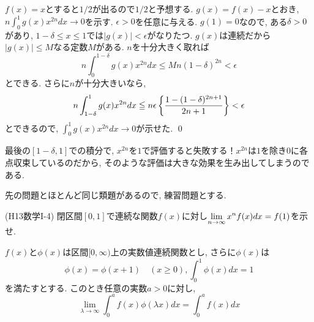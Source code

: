 \begin{egans} $f(x) = x$とすると$1/2$が出るので$1/2$と予想する.
$g(x) = f(x) - x$とおき, $n\int_{0}^{1}g(x)x^{2n}dx \to 0$を示す. $\epsilon>0$を任意に与える. $g(1) = 0$なので, ある$\delta>0$があり, $1-\delta\leq x\leq 1$では$|g(x)| < \epsilon$がなりたつ. $g(x)$は連続だから$|g(x)|\leq M$なる定数$M$がある. $n$を十分大きく取れば
\[n\int_{0}^{1-\delta} g(x)x^{2n}dx \leq Mn(1-\delta)^{2n} < \epsilon \]
とできる. さらに$n$が十分大きいなら,
\[n\int_{1-\delta}^{1} g(x)x^{2n}dx \leqq n\epsilon \left\{ \dfrac{1-(1-\delta)^{2n+1}}{2n+1} \right\} < \epsilon\]
とできるので, $\int_{0}^{1}g(x)x^{2n}dx\to 0$が示せた. \qed
\end{egans}
\begin{rem}
最後の$[1-\delta,1]$での積分で, $x^{2n}$を$1$で評価すると失敗する！$x^{2n}$は$1$を除き$0$に各点収束しているのだから, そのような評価は大きな効果を生み出してしまうのである.
\end{rem}

先の問題とほとんど同じ類題があるので, 練習問題とする.
\begin{prac} (H13数学I-4)
閉区間$[0,1]$で連続な関数$f(x)$に対し$\displaystyle\lim_{n\to \infty} x^nf(x)dx = f(1)$を示せ.
\end{prac}



\begin{egprob}
$f(x)$と$\phi(x)$は区間$[0,\infty)$上の実数値連続関数とし, さらに$\phi(x)$は
\[\phi(x) = \phi(x+1)\quad (x\geq 0), \int_{0}^{1}\phi(x)dx = 1\]
を満たすとする. このとき任意の実数$a>0$に対し,
\[\lim_{\lambda \to \infty} \int_{0}^{a} f(x)\phi(\lambda x) dx = \int_{0}^{a} f(x)dx\]
\end{egprob}

